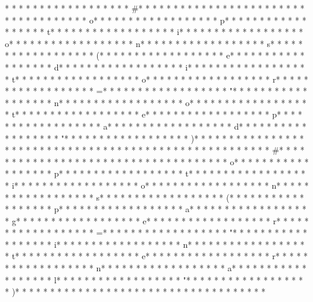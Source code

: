 * * *  * * *  * * *  *  * * *  *  * * *  * #* * *  * * *  * * *  *  * * *  *  * * *  *  * * *  * * *  * * *  *  * * *  *  * * *  * o* * *  * * *  * * *  *  * * *  *  * * *  * p* * *  * * *  * * *  *  * * *  *  * * *  * t* * *  * * *  * * *  *  * * *  *  * * *  * i* * *  * * *  * * *  *  * * *  *  * * *  * o* * *  * * *  * * *  *  * * *  *  * * *  * n* * *  * * *  * * *  *  * * *  *  * * *  * s* * *  * * *  * * *  *  * * *  *  * * *  * (* * *  * * *  * * *  *  * * *  *  * * *  * e* * *  * * *  * * *  *  * * *  *  * * *  * d* * *  * * *  * * *  *  * * *  *  * * *  * i* * *  * * *  * * *  *  * * *  *  * * *  * t* * *  * * *  * * *  *  * * *  *  * * *  * o* * *  * * *  * * *  *  * * *  *  * * *  * r* * *  * * *  * * *  *  * * *  *  * * *  * =* * *  * * *  * * *  *  * * *  *  * * *  * "* * *  * * *  * * *  *  * * *  *  * * *  * n* * *  * * *  * * *  *  * * *  *  * * *  * o* * *  * * *  * * *  *  * * *  *  * * *  * t* * *  * * *  * * *  *  * * *  *  * * *  * e* * *  * * *  * * *  *  * * *  *  * * *  * p* * *  * * *  * * *  *  * * *  *  * * *  * a* * *  * * *  * * *  *  * * *  *  * * *  * d* * *  * * *  * * *  *  * * *  *  * * *  * "* * *  * * *  * * *  *  * * *  *  * * *  * )* * *  * * *  * * *  *  * * *  *  * * *  *  * * *  * * *  * * *  *  * * *  *  * * *  * 
* * *  * * *  * * *  *  * * *  *  * * *  * #* * *  * * *  * * *  *  * * *  *  * * *  *  * * *  * * *  * * *  *  * * *  *  * * *  * o* * *  * * *  * * *  *  * * *  *  * * *  * p* * *  * * *  * * *  *  * * *  *  * * *  * t* * *  * * *  * * *  *  * * *  *  * * *  * i* * *  * * *  * * *  *  * * *  *  * * *  * o* * *  * * *  * * *  *  * * *  *  * * *  * n* * *  * * *  * * *  *  * * *  *  * * *  * s* * *  * * *  * * *  *  * * *  *  * * *  * (* * *  * * *  * * *  *  * * *  *  * * *  * p* * *  * * *  * * *  *  * * *  *  * * *  * a* * *  * * *  * * *  *  * * *  *  * * *  * g* * *  * * *  * * *  *  * * *  *  * * *  * e* * *  * * *  * * *  *  * * *  *  * * *  * r* * *  * * *  * * *  *  * * *  *  * * *  * =* * *  * * *  * * *  *  * * *  *  * * *  * "* * *  * * *  * * *  *  * * *  *  * * *  * i* * *  * * *  * * *  *  * * *  *  * * *  * n* * *  * * *  * * *  *  * * *  *  * * *  * t* * *  * * *  * * *  *  * * *  *  * * *  * e* * *  * * *  * * *  *  * * *  *  * * *  * r* * *  * * *  * * *  *  * * *  *  * * *  * n* * *  * * *  * * *  *  * * *  *  * * *  * a* * *  * * *  * * *  *  * * *  *  * * *  * l* * *  * * *  * * *  *  * * *  *  * * *  * "* * *  * * *  * * *  *  * * *  *  * * *  * )* * *  * * *  * * *  *  * * *  *  * * *  * 
* * *  * * *  * * *  *  * * *  *  * * *  * 

